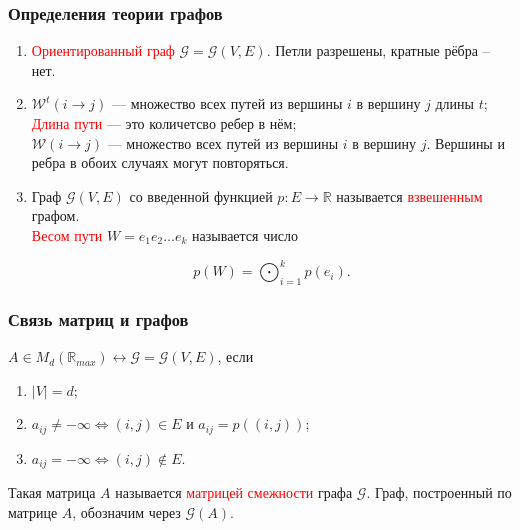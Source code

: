 \documentclass{beamer}
\newcommand{\cred}[1]{\textcolor{red}{#1}}
\begin{document}
\begin{frame}
\frametitle{Определения теории графов} 
\begin{enumerate}
	\item \cred{Ориентированный граф} $\mathcal{G} = {\mathcal{G}(V,E)}$. Петли разрешены, кратные рёбра -- нет.
	\item $\mathcal{W}^t(i \rightarrow j)$ --- множество всех путей из вершины $i$ в вершину $j$ длины $t$;\\
	\cred{Длина пути} --- это количетсво ребер в нём; \\
	$\mathcal{W}(i \rightarrow j)$ --- множество всех путей из вершины $i$ в вершину $j$. Вершины и ребра в обоих случаях могут повторяться.
	\item Граф $\mathcal{G}(V, E)$ со введенной функцией $p : E \rightarrow \mathbb{R}$ называется \cred{взвешенным} графом.\\
	\cred{Весом пути} $W = e_1e_2\dots e_k$ называется число 

	\begin{equation*}
		p(W) = \bigodot_{i = 1}^k p(e_i).
	\end{equation*}
\end{enumerate}

\end{frame}


\begin{frame}
\frametitle{Связь матриц и графов}
$A \in M_d(\mathbb{R}_{max}) \longleftrightarrow \mathcal{G} = {\mathcal{G}(V,E)}$, если
\begin{enumerate}
	\item $|V| = d$;
	\item $a_{ij} \neq -\infty \Leftrightarrow (i, j) \in E$ и $a_{ij} = p((i, j))$;
	\item $a_{ij} = -\infty \Leftrightarrow (i, j) \notin E$.
\end{enumerate}
Такая матрица $A$ называется \cred{матрицей смежности} графа $\mathcal{G}$. Граф, построенный по матрице $A$, обозначим через $\mathcal{G}(A)$.

\end{frame}

\end{document}

